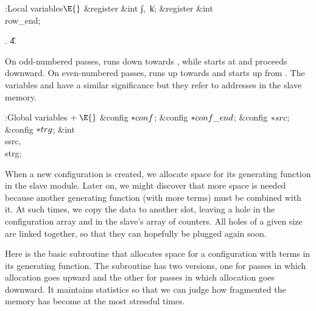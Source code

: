 \B{}:Local variables\X${}\E{}$\6
\&{register} \&{int} \|j${},{}$ \|k;\6
\&{register} \&{int} \\{row\_end};\par
{}.
\U4.\fi

On odd-numbered passes,  runs down towards ,
while 
starts at  and proceeds downward. On even-numbered
passes,
 runs up towards  and  starts
up from .
The variables  and  have a similar significance but
they refer to addresses in the slave memory.

\Y\B\4:Global variables\X${}\mathrel+\E{}$\6
\&{config} ${}{*}\\{conf}{}$;\6
\&{config} ${}{*}\\{conf\_end}{}$;\6
\&{config} ${}{*}\\{src}{}$;\6
\&{config} ${}{*}\\{trg}{}$;\6
\&{int} \\{ssrc}${},{}$ \\{strg};\par
\fi

When a new configuration is created, we allocate space for its
generating function in the slave module. Later on, we might discover
that more space is needed because another generating function (with
more terms) must be combined with it. At such times, we copy the data to
another slot, leaving a hole in the configuration array and in the slave's
array of counters. All holes of a given size are linked together,
so that they can hopefully be plugged again soon.

Here is the basic subroutine that allocates space for a configuration with
 terms in its generating function. The subroutine has two
versions,
one for passes in which allocation goes upward and the other for
passes in which allocation goes downward. It maintains statistics so
that we can judge how fragmented the memory has become at
the most stressful times.

